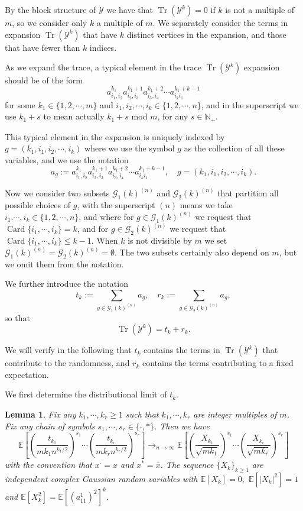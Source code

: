 \documentclass[12pt, reqno]{amsart}
\newtheorem{lemma}[theorem]{Lemma}
\theoremstyle{definition}
\theoremstyle{remark}
\numberwithin{equation}{section}
\begin{document}
By the block structure of $\mathcal{Y}$ we have that $\operatorname{Tr}(\mathcal{Y}^k)=0$ if $k$ is not a multiple of $m$, so we consider only $k$ a multiple of $m$. We separately consider the terms in expansion $\operatorname{Tr}(\mathcal{Y}^k)$ that have $k$ distinct vertices in the expansion, and those that have fewer than $k$ indices.

As we expand the trace, a typical element in the trace $\operatorname{Tr}(\mathcal{Y}^k)$ expansion should be of the form $$a_{i_1,i_2}^{k_1}a_{i_2,i_3}^{k_1+1} a_{i_3,i_4}^{k_1+2}\cdots a_{i_ki_1}^{k_1+k-1}$$ 
for some $k_1\in\{1,2,\cdots,m\}$ and $i_1,i_2,\cdots,i_k\in\{1,2,\cdots,n\}$, and in the superscript we use $k_1+s$ to mean actually $k_1+s$ mod $m$, for any $s\in\mathbb{N}_+$.

This typical element in the expansion is uniquely indexed by $g=(k_1,i_1,i_2,\cdots,i_k)$ where we use the symbol $g$ as the collection of all these variables, and we use the notation
$$a_g:=a_{i_1,i_2}^{k_1}a_{i_2,i_3}^{k_1+1} a_{i_3,i_4}^{k_1+2}\cdots a_{i_ki_1}^{k_1+k-1},\quad g=(k_1,i_1,i_2,\cdots,i_k).
$$


Now we consider two subsets $\mathcal{G}_1(k)^{(n)}$ and $\mathcal{G}_2(k)^{(n)}$ that partition all possible choices of $g$, with the superscript $(n)$ means we take $i_1.\cdots,i_k\in\{1,2,\cdots,n\}$, and where for $g\in \mathcal{G}_1(k)^{(n)}$ we request that $\operatorname{Card}\{i_1,\cdots,i_k\}=k$, and for $g\in \mathcal{G}_2(k)^{(n)}$ we request that $\operatorname{Card}\{i_1,\cdots,i_k\}\leq k-1.$ When $k$ is not divisible by $m$ we set $\mathcal{G}_1(k)^{(n)}=\mathcal{G}_2(k)^{(n)}=\emptyset.$ The two subsets certainly also depend on $m$, but we omit them from the notation.

We further introduce the notation 
$$t_k:=\sum_{g\in \mathcal{G}_1(k)^{(n)}} a_g,\quad r_k:=\sum_{g\in \mathcal{G}_2(k)^{(n)}} a_g,$$ so that $$
\operatorname{Tr}(\mathcal{Y}^k)=t_k+r_k.
$$


We will verify in the following that $t_k$ contains the terms in $\operatorname{Tr}(\mathcal{Y}^k)$ that contribute to the randomness, and $r_k$ contains the terms contributing to a fixed expectation.


We first determine the distributional limit of $t_k$.

\begin{lemma} Fix any $k_1,\cdots,k_r\geq 1$ such that $k_1,\cdots,k_r$ are integer multiples of $m$. Fix any chain of symbols $s_1,\cdots,s_r\in \{\cdot,*\}$. Then we have
$$
\mathbb{E}\left[(\frac{t_{k_1}}{mk_1n^{k_1/2}})^{s_1}\cdots (\frac{t_{k_r}}{mk_rn^{k_r/2}})^{s_r}\right]\to_{n\to\infty}\mathbb{E}\left[(\frac{X_{k_1}}{\sqrt{mk_1}})^{s_1}\cdots (\frac{X_{k_r}}{\sqrt{mk_r}})^{s_r}\right]
$$with the convention that $x^\cdot=x$ and $x^*=\bar{x}$. The sequence $\{X_k\}_{k\geq 1}$ are independent complex Gaussian random variables with $\mathbb{E}[X_k]=0,$  $\mathbb{E}[|X_k|^2]=1$ and  $\mathbb{E}[X_k^2]=\mathbb{E}[(a_{11}^1)^2]^k.$
\end{lemma}
\end{document}
